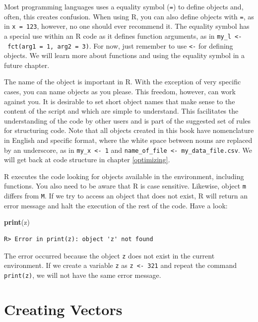 \documentclass[
  12pt,
]{book}
\newenvironment{Shaded}{\begin{snugshade}}{\end{snugshade}}
\newcommand{\KeywordTok}[1]{\textcolor[rgb]{0.27,0.27,0.27}{\textbf{#1}}}
\newcommand{\NormalTok}[1]{#1}
\begin{document}
Most programming languages uses a equality symbol (\texttt{=}) to define objects and, often, this creates confusion. When using R, you can also define objects with \texttt{=}, as in \texttt{x\ =\ 123}, however, no one should ever recommend it. The equality symbol has a special use within an R code as it defines function arguments, as in \texttt{my\_l\ \textless{}-\ fct(arg1\ =\ 1,\ arg2\ =\ 3)}. For now, just remember to use \texttt{\textless{}-} for defining objects. We will learn more about functions and using the equality symbol in a future chapter.

The name of the object is important in R. With the exception of very specific cases, you can name objects as you please. This freedom, however, can work against you. It is desirable to set short object names that make sense to the content of the script and which are simple to understand. This facilitates the understanding of the code by other users and is part of the suggested set of rules for structuring code. Note that all objects created in this book have nomenclature in English and specific format, where the white space between nouns are replaced by an underscore, as in \texttt{my\_x\ \textless{}-\ 1} and \texttt{name\_of\_file\ \textless{}-\ \textquotesingle{}my\_data\_file.csv\textquotesingle{}}. We will get back at code structure in chapter \ref{optimizing}.

R executes the code looking for objects available in the environment, including functions. You also need to be aware that R is case sensitive. Likewise, object \texttt{m} differs from \texttt{M}. If we try to access an object that does not exist, R will return an error message and halt the execution of the rest of the code. Have a look:

\begin{Shaded}
\begin{Highlighting}[]
\KeywordTok{print}\NormalTok{(z)}
\end{Highlighting}
\end{Shaded}

\begin{verbatim}
R> Error in print(z): object 'z' not found
\end{verbatim}

The error occurred because the object \texttt{z} does not exist in the current environment. If we create a variable \texttt{z} as \texttt{z\ \textless{}-\ 321} and repeat the command \texttt{print(z)}, we will not have the same error message.

\hypertarget{creating-vectors}{%
\section{Creating Vectors}\label{creating-vectors}}
\end{document}
